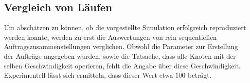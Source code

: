 \subsection{Vergleich von Läufen}
Um abschätzen zu können, ob die vorgestellte Simulation erfolgreich reproduziert werden konnte, werden zu erst die Auswertungen von rein sequentiellen Auftragszusammenstellungen verglichen. Obwohl die Parameter zur Erstellung der Aufträge angegeben wurden, sowie die Tatsache, dass alle Knoten mit der selben Geschwindigkeit operieren, fehlt die Angabe über diese Geschwindigkeit. Experimentell lässt sich ermitteln, dass dieser Wert etwa $100$ beträgt.

\begin{figure}
\centering
{}

\end{figure}
